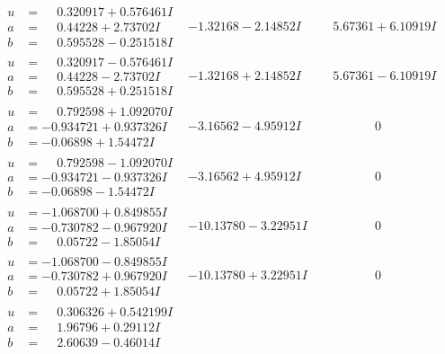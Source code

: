 \documentclass[1p]{elsarticle_modified}
\theoremstyle{definition}
\begin{document}
$$\begin{array}{c|c|c}
\begin{aligned}
u &= \phantom{-}0.320917 + 0.576461 I \\
a &= \phantom{-}0.44228 + 2.73702 I \\
b &= \phantom{-}0.595528 - 0.251518 I\end{aligned}
 & -1.32168 - 2.14852 I & \phantom{-}5.67361 + 6.10919 I \\ \hline\begin{aligned}
u &= \phantom{-}0.320917 - 0.576461 I \\
a &= \phantom{-}0.44228 - 2.73702 I \\
b &= \phantom{-}0.595528 + 0.251518 I\end{aligned}
 & -1.32168 + 2.14852 I & \phantom{-}5.67361 - 6.10919 I \\ \hline\begin{aligned}
u &= \phantom{-}0.792598 + 1.092070 I \\
a &= -0.934721 + 0.937326 I \\
b &= -0.06898 + 1.54472 I\end{aligned}
 & -3.16562 - 4.95912 I & \phantom{-0.000000 } 0 \\ \hline\begin{aligned}
u &= \phantom{-}0.792598 - 1.092070 I \\
a &= -0.934721 - 0.937326 I \\
b &= -0.06898 - 1.54472 I\end{aligned}
 & -3.16562 + 4.95912 I & \phantom{-0.000000 } 0 \\ \hline\begin{aligned}
u &= -1.068700 + 0.849855 I \\
a &= -0.730782 - 0.967920 I \\
b &= \phantom{-}0.05722 - 1.85054 I\end{aligned}
 & -10.13780 - 3.22951 I & \phantom{-0.000000 } 0 \\ \hline\begin{aligned}
u &= -1.068700 - 0.849855 I \\
a &= -0.730782 + 0.967920 I \\
b &= \phantom{-}0.05722 + 1.85054 I\end{aligned}
 & -10.13780 + 3.22951 I & \phantom{-0.000000 } 0 \\ \hline\begin{aligned}
u &= \phantom{-}0.306326 + 0.542199 I \\
a &= \phantom{-}1.96796 + 0.29112 I \\
b &= \phantom{-}2.60639 - 0.46014 I\end{aligned}

\end{array}$$
\end{document}
